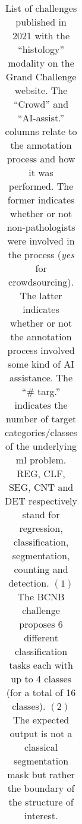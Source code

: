 \begin{table}
\begin{tabular}{|ccc|ccccccc|}
    \hline
  \end{tabular}
  \caption{List of challenges published in 2021 with the ``histology'' modality on the Grand Challenge website. The ``Crowd'' and 
  ``AI-assist.'' columns relate to the annotation process and how it was performed. The former indicates whether or not non-pathologists 
  were involved in the process (\ie \textit{yes} for crowdsourcing). The latter indicates whether or not the annotation process involved 
  some kind of AI assistance. The ``\# targ.'' indicates the number of target categories/classes of the underlying \acrlong{ml} problem. REG, 
  CLF, SEG, CNT and DET respectively stand for regression, classification, segmentation, counting and detection. $(1)$ The BCNB challenge proposes 6 different classification tasks each with up to 4 classes (for a total of 16 classes). $(2)$ The expected output is not a  classical segmentation mask but rather the boundary of the structure of interest.}
  \label{tab:backdp:datascarcity-grandchallenge}
\end{table}

